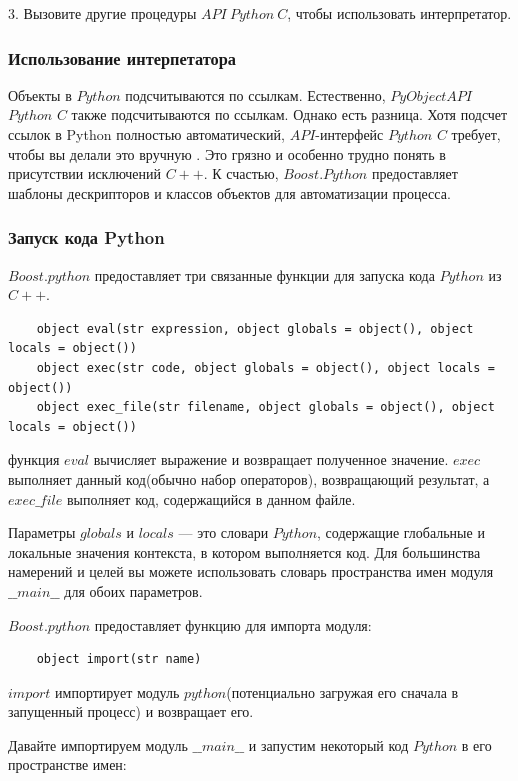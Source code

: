 \documentclass[a4paper, 14pt]{extarticle}
\makeatletter
\newcommand{\verbatimfont}[1]{\renewcommand{\verbatim@font}{\ttfamily#1}}
\makeatother
\begin{document}
3. Вызовите другие процедуры $API\ Python\ C$, чтобы использовать интерпретатор.

\subsubsection{Использование интерпетатора}
Объекты в $Python$ подсчитываются по ссылкам. Естественно, $PyObjectAPI$ $Python$ $C$ также подсчитываются по ссылкам. Однако есть разница. Хотя подсчет ссылок в Python полностью автоматический, $API$-интерфейс $Python$ $C$ требует, чтобы вы делали это вручную . Это грязно и особенно трудно понять в присутствии исключений $C++$. К счастью, $Boost.Python$ предоставляет шаблоны дескрипторов и классов объектов для автоматизации процесса.

\subsubsection{Запуск кода Python}
$Boost.python$ предоставляет три связанные функции для запуска кода $Python$ из $C++$.
\verbatimfont{\small}
\begin{verbatim}
    object eval(str expression, object globals = object(), object locals = object())
    object exec(str code, object globals = object(), object locals = object())
    object exec_file(str filename, object globals = object(), object locals = object())
\end{verbatim}

функция $eval$ вычисляет выражение и возвращает полученное значение. $exec$ выполняет данный код(обычно набор операторов), возвращающий результат, а $exec\_file$ выполняет код, содержащийся в данном файле.

Параметры $globals$ и $locals$ --- это словари $Python$, содержащие глобальные и локальные значения контекста, в котором выполняется код. Для большинства намерений и целей вы можете использовать словарь пространства имен модуля $\_\_main\_\_$ для обоих параметров.

$Boost.python$ предоставляет функцию для импорта модуля:
\begin{verbatim}
    object import(str name)
\end{verbatim}

$import$ импортирует модуль $python$(потенциально загружая его сначала в запущенный процесс) и возвращает его.

Давайте импортируем модуль $\_\_main\_\_$ и запустим некоторый код $Python$ в его пространстве имен:
\end{document}
